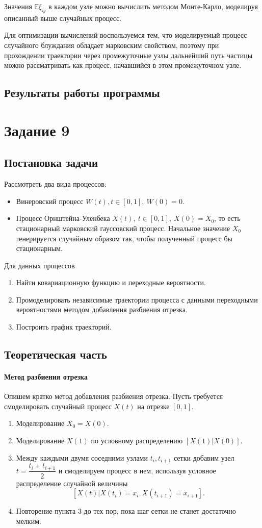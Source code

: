 \documentclass[16pt]{article}
\begin{document}
Значения $\mathbb{E}\xi_{ij}$ в каждом узле можно вычислить методом Монте-Карло, моделируя описанный выше случайных процесс.

Для оптимизации вычислений воспользуемся тем, что моделируемый процесс случайного блуждания обладает марковским свойством, поэтому при прохождении траектории через промежуточные узлы дальнейший путь частицы можно рассматривать как процесс, начавшийся в этом промежуточном узле.
\subsection{Результаты работы программы}

\section{Задание 9}
\subsection{Постановка задачи}
Рассмотреть два вида процессов:
\begin{itemize}
	\item Винеровский процесс $W(t), t \in [0, 1], \ W(0) = 0.$
	\item Процесс Орнштейна-Уленбека $X(t),\ t \in [0, 1], \ X(0) = X_0$, то есть стационарный марковский гауссовский процесс. Начальное значение $X_0$ генерируется случайным образом так, чтобы полученный процесс бы стационарным.
\end{itemize}

Для данных процессов
\begin{enumerate}
	\item Найти ковариационную функцию и переходные вероятности.
	\item Промоделировать независимые траектории процесса с данными переходными вероятностями методом добавления разбиения отрезка.
	\item Построить график траекторий.
\end{enumerate}

\subsection{Теоретическая часть}
\paragraph{Метод разбиения отрезка}
Опишем кратко метод добавления разбиения отрезка. Пусть требуется смоделировать случайный процесс $X(t)$ на отрезке $[0, 1]$. 
\begin{enumerate}
	\item Моделирование $X_0 = X(0)$.
	\item Моделирование $X(1)$ по условному распределению $[X(1)|X(0)]$.
	\item Между каждыми двумя соседними узлами $t_i, t_{i + 1}$ сетки добавим узел $t = \dfrac{t_i + t_{i+1}}{2}$ и смоделируем процесс в нем, используя условное распределение случайной величины $$[X(t)|X(t_{i}) = x_i, X(t_{i+1}) = x_{i+1}].$$
	\item Повторение пункта 3 до тех пор, пока шаг сетки не станет достаточно мелким.
\end{enumerate}
\end{document}
